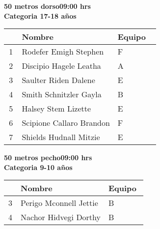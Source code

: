 \begin{minipage}{0.95\linewidth}\vspace{0.5cm} 
\begin{flushleft}
\textbf{
\hspace{-0.15cm}50 metros dorso\hspace{1.5cm}09:00 hrs \\Categoria 17-18 años}\vspace{-0.2cm} 
\end{flushleft}
\begin{tabular}{cp{0.63\linewidth}l}
\hline
& \textbf{Nombre} & \textbf{Equipo} \\ \hline
1 & Rodefer Emigh Stephen & F \\ 
2 & Discipio Hagele Leatha & A \\ 
3 & Saulter Riden Dalene & E \\ 
4 & Smith Schnitzler Gayla & B \\ 
5 & Halsey Stem Lizette & E \\ 
6 & Scipione Callaro Brandon & F \\ 
7 & Shields Hudnall Mitzie & E \\ 
\end{tabular}
\end{minipage}
\begin{minipage}{0.95\linewidth}\vspace{0.5cm} 
\begin{flushleft}
\textbf{
\hspace{-0.15cm}50 metros pecho\hspace{1.5cm}09:00 hrs \\Categoria 9-10 años}\vspace{-0.2cm} 
\end{flushleft}
\begin{tabular}{cp{0.63\linewidth}l}
\hline
& \textbf{Nombre} & \textbf{Equipo} \\ \hline
3 & Perigo Mconnell Jettie & B \\ 
4 & Nachor Hidvegi Dorthy & B \\ 
\end{tabular}
\end{minipage}
